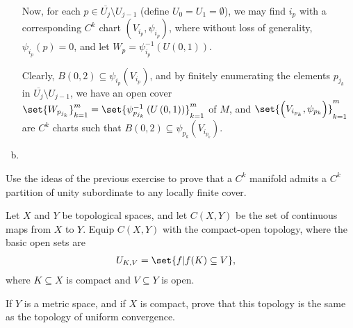 \documentclass[10pt]{mypackage}
\begin{document}
\begin{solution}
\begin{enumerate}[(a)]
      Now, for each $p\in \overline{U_{j}}\setminus U_{j-1}$ (define $U_{0} = U_{1} = \emptyset$), we may find $i_p$ with a corresponding $C^{k}$ chart $\left( V_{i_p},\psi_{i_p} \right)$, where without loss of generality, $\psi_{i_p}\left( p \right) = 0$, and let $W_p = \psi_{i_p}^{-1}\left( U\left( 0,1 \right) \right)$.\newline

      Clearly, $B\left( 0,2 \right)\subseteq \psi_{i_p}\left( V_{i_p} \right)$, and by finitely enumerating the elements $p_{j_k}$ in $ \overline{U_{j}}\setminus U_{j-1} $, we have an open cover $\set{W_{p_{j_k}}}_{k=1}^{m} = \set{\psi_{p_{j_k}}^{-1}\left( U\left( 0,1 \right) \right)}_{k=1}^{m}$ of $M$, and $\set{\left( V_{i_{p_k}},\psi_{p_k} \right)}_{k=1}^{m}$ are $ C^{k}$ charts such that $B\left( 0,2 \right)\subseteq \psi_{p_k}\left( V_{i_{p_k}} \right)$.
    \item 
  \end{enumerate}
\end{solution}
\begin{problem}[Problem 6]
  Use the ideas of the previous exercise to prove that a $C^{k}$ manifold admits a $C^{k}$ partition of unity subordinate to any locally finite cover.
\end{problem}
\begin{problem}[Problem 7]
  Let $X$ and $Y$ be topological spaces, and let $C\left( X,Y \right)$ be the set of continuous maps from $X$ to $Y$. Equip $C\left( X,Y \right)$ with the compact-open topology, where the basic open sets are
  \begin{align*}
    U_{K,V} &= \set{f | f(K)\subseteq V},
  \end{align*}
  where $K\subseteq X$ is compact and $V\subseteq Y$ is open.\newline

  If $Y$ is a metric space, and if $X$ is compact, prove that this topology is the same as the topology of uniform convergence.
\end{problem}
\end{document}

